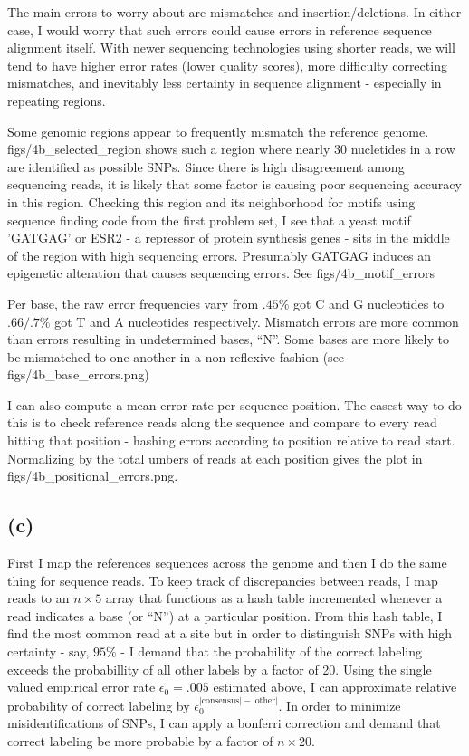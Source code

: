 \documentclass[12pt,draft,a4paper]{article}
\begin{document}
The main errors to worry about are mismatches and insertion/deletions. In either case, I would worry that such errors could cause errors in reference sequence alignment itself. With newer sequencing technologies using shorter reads, we will tend to have higher error rates (lower quality scores), more difficulty correcting mismatches, and inevitably less certainty in sequence alignment - especially in repeating regions.

Some genomic regions appear to frequently mismatch the reference genome. figs/4b\_selected\_region shows such a region where nearly 30 nucletides in a row are identified as possible SNPs. Since there is high disagreement among sequencing reads, it is likely that some factor is causing poor sequencing accuracy in this region. Checking this region and its neighborhood for motifs using sequence finding code from the first problem set, I see that a yeast motif 'GATGAG' or ESR2 - a repressor of protein synthesis genes - sits in the middle of the region with high sequencing errors. Presumably GATGAG induces an epigenetic alteration that causes sequencing errors. See figs/4b\_motif\_errors
                                   
Per base, the raw error frequencies vary from $.45\%$ got C and G nucleotides to $.66/.7\%$ got T and A nucleotides respectively. Mismatch errors are more common than errors resulting in undetermined bases, ``N''. Some bases are more likely to be mismatched to one another in a non-reflexive fashion (see figs/4b\_base\_errors.png)

I can also compute a mean error rate per sequence position. The easest way to do this is to check reference reads along the sequence and compare to every read hitting that position - hashing errors according to position relative to read start. Normalizing by the total umbers of reads at each position gives the plot in figs/4b\_positional\_errors.png.

\subsection*{(c)}
First I map the references sequences across the genome and then I do the same thing for sequence reads. To keep track of discrepancies between reads, I map reads to an $n\times5$ array that functions as a hash table incremented whenever a read indicates a base (or ``N'') at a particular position. From this hash table, I find the most common read at a site but in order to distinguish SNPs with high certainty - say, $95\%$ - I demand that the probability of the correct labeling exceeds the probabillity of all other labels by a factor of 20. Using the single valued empirical error rate $\epsilon_0 = .005$ estimated above, I can approximate relative probability of correct labeling by $\epsilon_0^{|\text{consensus}| - |\text{other}|}$. In order to minimize misidentifications of SNPs, I can apply a bonferri correction and demand that correct labeling be more probable by a factor of $n \times 20$.
\end{document}
